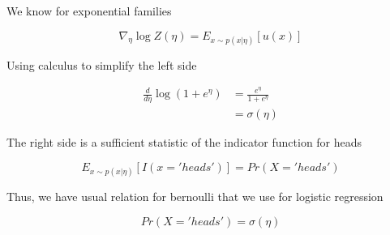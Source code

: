 \documentclass[a4paper]{article}
\begin{document}
We know for exponential families

\begin{equation}
  \nabla_\eta \log Z(\eta) = E_{ x \sim p( x \vert \eta ) } \left[ u(x) \right]
\end{equation}

Using calculus to simplify the left side

\begin{equation}
  \begin{split}
    \frac{ d} { d \eta} \log ( 1 + e^\eta) &= \frac{ e^\eta }{ 1+ e^\eta } \\
    &= \sigma(\eta)
  \end{split}
\end{equation}

The right side is a sufficient statistic of the indicator function for heads

\begin{equation}
  E_{ x \sim p( x \vert \eta ) } \left[ I(x = 'heads' ) \right] = Pr\left( X = 'heads' \right)
\end{equation}

Thus, we have usual relation for bernoulli that we use for logistic regression

\begin{equation}
  Pr\left( X = 'heads' \right) = \sigma(\eta)
\end{equation}
\end{document}
